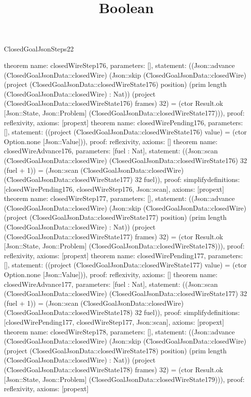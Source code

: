 \begin{lexlean}{ClosedGoalJsonSteps22}
\title{Boolean}
\begin{semanticmodule}
theorem{
 name: closedWireStep176, parameters: [],
 statement: ((Json::advance (ClosedGoalJsonData::closedWire) (Json::skip (ClosedGoalJsonData::closedWire) (project (ClosedGoalJsonData::closedWireState176) position) (prim length (ClosedGoalJsonData::closedWire) : Nat)) (project (ClosedGoalJsonData::closedWireState176) frames) 32) = (ctor Result.ok [Json::State, Json::Problem] (ClosedGoalJsonData::closedWireState177))), proof: reflexivity{}, axioms: [propext]
}
theorem{
 name: closedWirePending176, parameters: [],
 statement: ((project (ClosedGoalJsonData::closedWireState176) value) = (ctor Option.none [Json::Value])), proof: reflexivity{}, axioms: []
}
theorem{
 name: closedWireAdvance176, parameters: [fuel : Nat],
 statement: ((Json::scan (ClosedGoalJsonData::closedWire) (ClosedGoalJsonData::closedWireState176) 32 (fuel + 1)) = (Json::scan (ClosedGoalJsonData::closedWire) (ClosedGoalJsonData::closedWireState177) 32 fuel)), proof: simplify{definitions: [closedWirePending176, closedWireStep176, Json::scan]}, axioms: [propext]
}
theorem{
 name: closedWireStep177, parameters: [],
 statement: ((Json::advance (ClosedGoalJsonData::closedWire) (Json::skip (ClosedGoalJsonData::closedWire) (project (ClosedGoalJsonData::closedWireState177) position) (prim length (ClosedGoalJsonData::closedWire) : Nat)) (project (ClosedGoalJsonData::closedWireState177) frames) 32) = (ctor Result.ok [Json::State, Json::Problem] (ClosedGoalJsonData::closedWireState178))), proof: reflexivity{}, axioms: [propext]
}
theorem{
 name: closedWirePending177, parameters: [],
 statement: ((project (ClosedGoalJsonData::closedWireState177) value) = (ctor Option.none [Json::Value])), proof: reflexivity{}, axioms: []
}
theorem{
 name: closedWireAdvance177, parameters: [fuel : Nat],
 statement: ((Json::scan (ClosedGoalJsonData::closedWire) (ClosedGoalJsonData::closedWireState177) 32 (fuel + 1)) = (Json::scan (ClosedGoalJsonData::closedWire) (ClosedGoalJsonData::closedWireState178) 32 fuel)), proof: simplify{definitions: [closedWirePending177, closedWireStep177, Json::scan]}, axioms: [propext]
}
theorem{
 name: closedWireStep178, parameters: [],
 statement: ((Json::advance (ClosedGoalJsonData::closedWire) (Json::skip (ClosedGoalJsonData::closedWire) (project (ClosedGoalJsonData::closedWireState178) position) (prim length (ClosedGoalJsonData::closedWire) : Nat)) (project (ClosedGoalJsonData::closedWireState178) frames) 32) = (ctor Result.ok [Json::State, Json::Problem] (ClosedGoalJsonData::closedWireState179))), proof: reflexivity{}, axioms: [propext]
}
\end{semanticmodule}
\end{lexlean}
